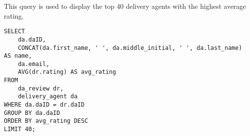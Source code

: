 This query is used to display the top 40 delivery agents with the highest average rating.

\begin{lstlisting}
SELECT
    da.daID,
    CONCAT(da.first_name, ' ', da.middle_initial, ' ', da.last_name) AS name,
    da.email,
    AVG(dr.rating) AS avg_rating
FROM
    da_review dr,
    delivery_agent da
WHERE da.daID = dr.daID
GROUP BY da.daID
ORDER BY avg_rating DESC
LIMIT 40;
\end{lstlisting}
